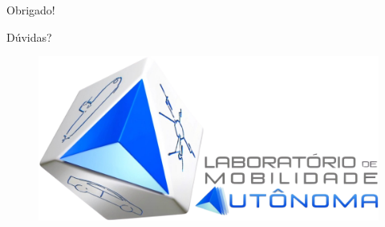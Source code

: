 \documentclass{if-beamer}
\begin{document}
%   



\begin{frame}{}
	
	\begin{block}{}
		
		\centering
		\Huge{Obrigado!}
		
		\LARGE
		
		\vspace{5mm}
		
		Dúvidas?
		
	\end{block}
	
	\vspace{4mm}
	
	\begin{figure}[H]
		\centering
		\includegraphics[width=0.5\linewidth]{img/core/Logo_LMA.png}
	\end{figure}
	
\end{frame}
\end{document}
